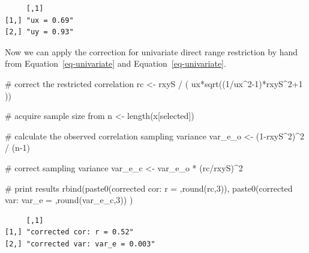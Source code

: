 \documentclass[
  letterpaper,
  DIV=11,
  numbers=noendperiod]{scrreprt}
\newenvironment{Shaded}{\begin{snugshade}}{\end{snugshade}}
\newcommand{\CommentTok}[1]{\textcolor[rgb]{0.37,0.37,0.37}{#1}}
\newcommand{\DecValTok}[1]{\textcolor[rgb]{0.68,0.00,0.00}{#1}}
\newcommand{\FunctionTok}[1]{\textcolor[rgb]{0.28,0.35,0.67}{#1}}
\newcommand{\NormalTok}[1]{\textcolor[rgb]{0.00,0.23,0.31}{#1}}
\newcommand{\OtherTok}[1]{\textcolor[rgb]{0.00,0.23,0.31}{#1}}
\newcommand{\SpecialCharTok}[1]{\textcolor[rgb]{0.37,0.37,0.37}{#1}}
\newcommand{\StringTok}[1]{\textcolor[rgb]{0.13,0.47,0.30}{#1}}
\begin{document}
\begin{verbatim}
     [,1]       
[1,] "ux = 0.69"
[2,] "uy = 0.93"
\end{verbatim}

Now we can apply the correction for univariate direct range restriction
by hand from Equation~\ref{eq-univariate} and
Equation~\ref{eq-univariate}.

\begin{Shaded}
\begin{Highlighting}[]
\CommentTok{\# correct the restricted correlation}
\NormalTok{rc }\OtherTok{\textless{}{-}}\NormalTok{ rxyS }\SpecialCharTok{/}\NormalTok{ ( ux}\SpecialCharTok{*}\FunctionTok{sqrt}\NormalTok{((}\DecValTok{1}\SpecialCharTok{/}\NormalTok{ux}\SpecialCharTok{\^{}}\DecValTok{2{-}1}\NormalTok{)}\SpecialCharTok{*}\NormalTok{rxyS}\SpecialCharTok{\^{}}\DecValTok{2}\SpecialCharTok{+}\DecValTok{1}\NormalTok{ ))}

\CommentTok{\# acquire sample size from }
\NormalTok{n }\OtherTok{\textless{}{-}} \FunctionTok{length}\NormalTok{(x[selected])}

\CommentTok{\# calculate the observed correlation sampling variance}
\NormalTok{var\_e\_o }\OtherTok{\textless{}{-}}\NormalTok{ (}\DecValTok{1}\SpecialCharTok{{-}}\NormalTok{rxyS}\SpecialCharTok{\^{}}\DecValTok{2}\NormalTok{)}\SpecialCharTok{\^{}}\DecValTok{2} \SpecialCharTok{/}\NormalTok{ (n}\DecValTok{{-}1}\NormalTok{)}

\CommentTok{\# correct sampling variance}
\NormalTok{var\_e\_c }\OtherTok{\textless{}{-}}\NormalTok{ var\_e\_o }\SpecialCharTok{*}\NormalTok{ (rc}\SpecialCharTok{/}\NormalTok{rxyS)}\SpecialCharTok{\^{}}\DecValTok{2}

\CommentTok{\# print results}
\FunctionTok{rbind}\NormalTok{(}\FunctionTok{paste0}\NormalTok{(}\StringTok{\textquotesingle{}corrected cor: r = \textquotesingle{}}\NormalTok{,}\FunctionTok{round}\NormalTok{(rc,}\DecValTok{3}\NormalTok{)),}
      \FunctionTok{paste0}\NormalTok{(}\StringTok{\textquotesingle{}corrected var: var\_e = \textquotesingle{}}\NormalTok{,}\FunctionTok{round}\NormalTok{(var\_e\_c,}\DecValTok{3}\NormalTok{))}
\NormalTok{      )}
\end{Highlighting}
\end{Shaded}

\begin{verbatim}
     [,1]                          
[1,] "corrected cor: r = 0.52"     
[2,] "corrected var: var_e = 0.003"
\end{verbatim}
\end{document}
